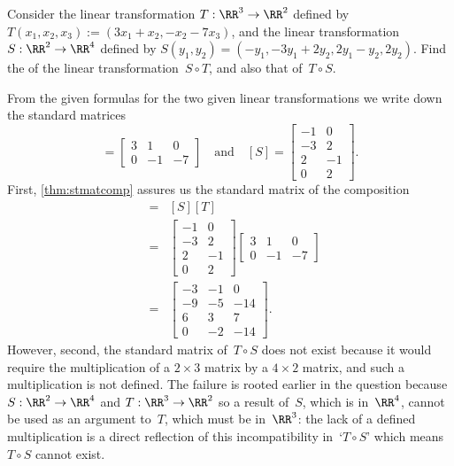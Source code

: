\begin{example} 
Consider the linear transformation \(T:\RR^3\to\RR^2\) defined by \(T(x_1,x_2,x_3):=(3x_1+x_2,-x_2-7x_3)\), and the linear transformation \(S:\RR^2\to\RR^4\) defined by \(S(y_1,y_2)=(-y_1, -3y_1+2y_2, 2y_1-y_2, 2y_2)\).
Find the  of the linear transformation~\(S\circ T\), and also that of~\(T\circ S\).
\begin{solution} 
From the given formulas for the two given linear transformations we write down the standard matrices
\begin{equation*}
[T]=\begin{bmatrix}3&1&0\\0&-1&-7  \end{bmatrix}
\quad\text{and}\quad
[S]=\begin{bmatrix} -1&0\\ -3&2\\2&-1\\0&2 \end{bmatrix}.
\end{equation*}
First, \cref{thm:stmatcomp} assures us the standard matrix of the composition
\begin{eqnarray*}
[S\circ T]&=&[S][T]
\\&=&\begin{bmatrix} -1&0\\ -3&2\\2&-1\\0&2 \end{bmatrix}
\begin{bmatrix}3&1&0\\0&-1&-7  \end{bmatrix}
\\&=&\begin{bmatrix}-3&-1&0
\\-9&-5&-14
\\6&3&7
\\0&-2&-14 \end{bmatrix}.
\end{eqnarray*}
However, second, the standard matrix of~\(T\circ S\) does not exist because it would require the multiplication of a \(2\times3\) matrix by a \(4\times 2\) matrix, and such a multiplication is not defined.
The failure is rooted earlier in the question because \(S:\RR^2\to\RR^4\) and \(T:\RR^3\to\RR^2\) so a result of~\(S\), which is in~\(\RR^4\), cannot be used as an argument to~\(T\), which must be in~\(\RR^3\): the lack of a defined multiplication is a direct reflection of this incompatibility in~`\(T\circ S\)' which means \(T\circ S\) cannot exist.
\end{solution}
\end{example}



